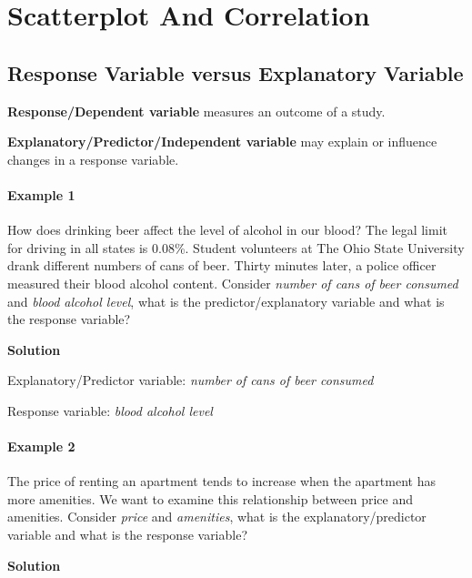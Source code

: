 \chapter{Scatterplot And Correlation}

\section{Response Variable versus Explanatory Variable}
\textbf{Response/Dependent variable} measures an outcome of a study. 

\vspace{0.2cm}

\noindent \textbf{Explanatory/Predictor/Independent variable} may explain or influence changes in a response variable. 

\subsubsection*{Example 1}
How does drinking beer affect the level of alcohol in our blood? The legal limit for driving in all states is 0.08\%. Student volunteers at The Ohio State University drank different numbers of cans of beer. Thirty minutes later, a police officer measured their blood alcohol content. Consider \textit{number of cans of beer consumed} and \textit{blood alcohol level}, what is the predictor/explanatory variable and what is the response variable? 

\vspace{0.2cm}

\textbf{Solution}

\vspace{0.2cm}

\noindent Explanatory/Predictor variable: \textit{number of cans of beer consumed}

\noindent Response variable: \textit{blood alcohol level} 

\subsubsection*{Example 2}
The price of renting an apartment tends to increase when the apartment has more amenities. We want to examine this relationship between price and amenities. Consider \textit{price} and \textit{amenities}, what is the explanatory/predictor variable and what is the response variable? 

\vspace{0.2cm}

\textbf{Solution}

